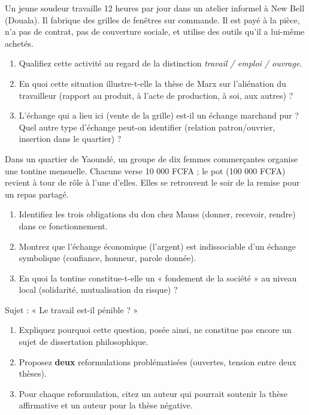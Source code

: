 \documentclass[11pt]{article}
\newcounter{popsec}
\newcounter{popsub}
\newcommand{\courssub}[1]{%
  \stepcounter{popsub}%
  \par\vspace{9pt}\noindent{\popxbold\fontsize{11.5}{13}\selectfont\color{popink}{\color{poporange}\thepopsec.\thepopsub}\hspace{6pt}#1}\par\nopagebreak\vspace{4pt}
}
\begin{document}
\courssub{Je m'entraîne}

\begin{exercice}
Un jeune soudeur travaille 12 heures par jour dans un atelier informel à New Bell (Douala). Il fabrique des grilles de fenêtres sur commande. Il est payé à la pièce, n'a pas de contrat, pas de couverture sociale, et utilise des outils qu'il a lui-même achetés.
\begin{enumerate}
    \item Qualifiez cette activité au regard de la distinction \emph{travail / emploi / ouvrage}.
    \item En quoi cette situation illustre-t-elle la thèse de Marx sur l'aliénation du travailleur (rapport au produit, à l'acte de production, à soi, aux autres) ?
    \item L'échange qui a lieu ici (vente de la grille) est-il un échange marchand pur ? Quel autre type d'échange peut-on identifier (relation patron/ouvrier, insertion dans le quartier) ?
\end{enumerate}
\end{exercice}

\begin{exercice}
Dans un quartier de Yaoundé, un groupe de dix femmes commerçantes organise une tontine mensuelle. Chacune verse 10 000 FCFA ; le pot (100 000 FCFA) revient à tour de rôle à l'une d'elles. Elles se retrouvent le soir de la remise pour un repas partagé.
\begin{enumerate}
    \item Identifiez les trois obligations du don chez Mauss (donner, recevoir, rendre) dans ce fonctionnement.
    \item Montrez que l'échange économique (l'argent) est indissociable d'un échange symbolique (confiance, honneur, parole donnée).
    \item En quoi la tontine constitue-t-elle un « fondement de la société » au niveau local (solidarité, mutualisation du risque) ?
\end{enumerate}
\end{exercice}

\begin{exercice}
Sujet : « Le travail est-il pénible ? »
\begin{enumerate}
    \item Expliquez pourquoi cette question, posée ainsi, ne constitue pas encore un sujet de dissertation philosophique.
    \item Proposez \textbf{deux} reformulations problématisées (ouvertes, tension entre deux thèses).
    \item Pour chaque reformulation, citez un auteur qui pourrait soutenir la thèse affirmative et un auteur pour la thèse négative.
\end{enumerate}
\end{exercice}
\end{document}
